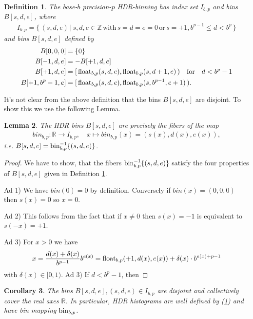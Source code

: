 \documentclass{article}
\theoremstyle{plain}
\newtheorem{definition}{Definition}[section]
\newtheorem{lemma}[definition]{Lemma}
\newtheorem{corollary}[definition]{Corollary}
\newcommand{\IR}{\mathbb{R}}
\newcommand{\IZ}{\mathbb{Z}}
\newcommand{\qtext}[1]{\quad\text{#1}\quad} %
\newcommand{\lra}{\longrightarrow}
\begin{document}
\begin{definition} \label{hdrdef}
  The base-$b$ precision-$p$ HDR-binning has index set $I_{b,p}$ and bins $B[s,d,e]$, where
  \begin{align*}
    I_{b,p} = \{\, (s,d,e) \,|\, s,d,e \in \IZ \,\text{with}\, s=d=e=0 \,\text{or}\, s=\pm1, b^{p-1} \leq d < b^p \,\}
  \end{align*}
  and bins $B[s,d,e]$ defined by
  \begin{align}
    B[0,0,0]  &= \{ 0 \} \\
    B[-1,d,e] &= -B[+1,d,e] \\
    B[+1,d,e] &= \mathopen[\,\float_{b,p}(s,d,e), \float_{b,p}(s,d+1,e)\,\mathopen) \qtext{for}  d < b^p-1 \\
    B[+1,b^p-1,e] &= \mathopen[\,\float_{b,p}(s,d,e), \float_{b,p}(s,b^{p-1},e+1)\,\mathopen).
  \end{align}
\end{definition}

It's not clear from the above definition that the bins $B[s,d,e]$ are disjoint.
To show this we use the following Lemma.

\begin{lemma}
  The HDR bins $B[s,d,e]$ are precisely the fibers of the map
  \begin{align*}
    bin_{b,p}: \IR \lra I_{b,p}, \quad x \mapsto bin_{b,p}(x) = (s(x), d(x), e(x) ),
  \end{align*}
  i.e. $B[s,d,e] = \mathrm{bin}_{b,p}^{-1}\{ (s,d,e) \}$.
\end{lemma}

\begin{proof}
  We have to show, that the fibers $\mathrm{bin}_{b,p}^{-1}\{ (s,d,e) \}$ satisfy the four properties
  of $B[s,d,e]$ given in Definition \ref{hdrdef}.

  Ad 1) We have $bin(0) = 0$ by definition. Conversely if $bin(x) = (0,0,0)$ then $s(x) = 0$ so $x = 0$.

  Ad 2) This follows from the fact that if $x \neq 0$ then $s(x) = -1$ is equivalent to $s(-x) = +1$.

  Ad 3) For $x>0$ we have
  \begin{align*}
    x =  \frac{d(x) + \delta(x)}{b^{p-1}} b^{e(x)} = \mathrm{float}_{b,p}(+1,d(x), e(x)) + \delta(x) \cdot b^{e(x)+p-1}
  \end{align*}
  with $\delta(x) \in [0,1)$.
  Ad 3) If $d < b^p - 1$, then
\end{proof}

\begin{corollary}
  The bins $B[s,d,e], (s,d,e) \in I_{b,p}$ are disjoint and collectively cover the real axes $\IR$.
  In particular, HDR histograms are well defined by (\ref{hdrdef}) and have bin mapping $\mathrm{bin}_{b,p}$.
\end{corollary}
\end{document}
